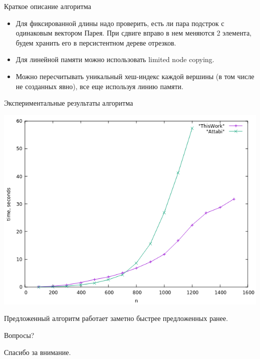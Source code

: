 \documentclass[hyperref=unicode,graphics=pdflatex,12pt]{beamer}
\begin{document}
\begin{frame}{Краткое описание алгоритма}
\vspace{0.5cm}
\hspace{0.5cm}
\begin{itemize}
\item Для фиксированной длины надо проверить, есть ли пара подстрок с одинаковым вектором Парея. При сдвиге вправо в нем меняются 2 элемента, будем хранить его в персистентном дереве отрезков.
\item<2-> Для линейной памяти можно использовать limited node copying.
\item<3-> Можно пересчитывать уникальный хеш-индекс каждой вершины (в том числе не созданных явно), все еще используя линию памяти.
\end{itemize}
\end{frame}


\begin{frame}{Экспериментальные результаты алгоритма}
\begin{center}
\includegraphics[scale=0.5]{pics/common_lcas_n.png}
\end{center}

Предложенный алгоритм работает заметно быстрее предложенных ранее.
\end{frame}

\begin{frame}{Вопросы?}
\begin{center}
Спасибо за внимание.
\end{center}
\end{frame}
\end{document}
